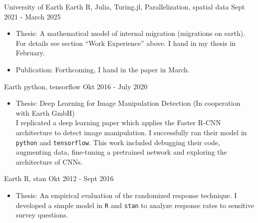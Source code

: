 
{University of Earth} {Earth} {R, Julia, Turing.jl,
  Parallelization, spatial data} {Sept 2021 - March 2025}
\begin{itemize}
  \item Thesis: A mathematical model of internal migration (migrations
        on earth). For details see section ``Work Experience'' above.
        I hand in my thesis in February.
  \item Publication: Forthcoming, I hand in the paper in March.
\end{itemize}

{Earth} {python, tensorflow} {Okt 2016 - July 2020}
\begin{itemize}
  \item Thesis: Deep Learning for Image Manipulation Detection (In
        cooperation with Earth GmbH) \\ I replicated a deep
        learning paper which applies the Faster R-CNN architecture to
        detect image manipulation. I successfully ran their model in
        \texttt{python} and \texttt{tensorflow}. This work included
        debugging their code, augmenting data, fine-tuning a
        pretrained network and exploring the architecture of CNNs.
\end{itemize}


 {Earth}
{R, stan} {Okt 2012 - Sept 2016}
\begin{itemize}
  \item Thesis: An empirical evaluation of the randomized response technique. I developed a simple model in \texttt{R} and \texttt{stan} to analyze response rates to sensitive survey questions.
\end{itemize}
